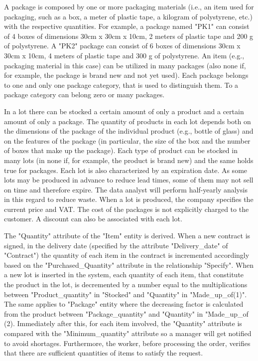 A package is composed by one or more packaging materials (i.e., an item used for packaging, such as a box, a meter of plastic tape, a kilogram of polystyrene, etc.) with the respective quantities. For example, a package named "PK1" can consist of 4 boxes of dimensions 30cm x 30cm x 10cm, 2 meters of plastic tape and 200 g of polystyrene. A "PK2" package can consist of 6 boxes of dimensions 30cm x 30cm x 10cm, 4 meters of plastic tape and 300 g of polystyrene. An item (e.g., packaging material in this case) can be utilized in many packages (also none if, for example, the package is brand new and not yet used). Each package belongs to one and only one package category, that is used to distinguish them. To a package category can belong zero or many packages.

In a lot there can be stocked a certain amount of only a product and a certain amount of only a package. The quantity of products in each lot depends both on the dimensions of the package of the individual product (e.g., bottle of glass) and on the features of the package (in particular, the size of the box and the number of boxes that make up the package). Each type of product can be stocked in many lots (in none if, for example, the product is brand new) and the same holds true for packages. Each lot is also characterized by an expiration date. As some lots may be produced in advance to reduce lead times, some of them may not sell on time and therefore expire. The data analyst will perform half-yearly analysis in this regard to reduce waste. When a lot is produced, the company specifies the current price and VAT. The cost of the packages is not explicitly charged to the customer. A discount can also be associated with each lot. 

The "Quantity" attribute of the "Item" entity is derived. When a new contract is signed, in the delivery date (specified by the attribute "Delivery\_date" of "Contract") the quantity of each item in the contract is incremented accordingly based on the "Purchased\_Quantity" attribute in the relationship "Specify". When a new lot is inserted in the system, each quantity of each item, that constitute the product in the lot, is decremented by a number equal to the multiplications between "Product\_quantity" in "Stocked" and "Quantity" in "Made\_up\_of(1)". The same applies to "Package" entity where the decreasing factor is calculated from the product between "Package\_quantity" and "Quantity" in "Made\_up\_of (2). Immediately after this, for each item involved, the "Quantity" attribute is compared with the "Minimum\_quantity" attribute so a manager will get notified to avoid shortages. Furthermore, the worker, before processing the order, verifies that there are sufficient quantities of items to satisfy the request.


